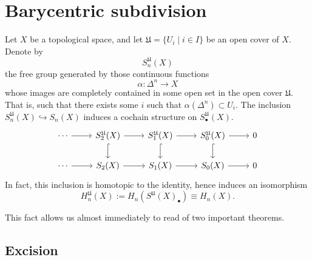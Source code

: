 \documentclass[main.tex]{subfiles}
\begin{document}
\section{Barycentric subdivision}
\label{sec:barycentric_subdivision}

\begin{fact}
  \label{fact:barycentric_subdivision}
  Let $X$ be a topological space, and let $\mathfrak{U} = \{U_{i} \mid i \in I\}$ be an open cover of $X$. Denote by
  \begin{equation*}
    S^{\mathfrak{U}}_{n}(X)
  \end{equation*}
  the free group generated by those continuous functions
  \begin{equation*}
    \alpha\colon \Delta^{n} \to X
  \end{equation*}
  whose images are completely contained in some open set in the open cover $\mathfrak{U}$. That is, such that there exists some $i$ such that $\alpha(\Delta^{n}) \subset U_{i}$. The inclusion $S^{\mathfrak{U}}_{n}(X) \hookrightarrow S_{n}(X)$ induces a cochain structure on $S^{\mathfrak{U}}_{\bullet}(X)$.
  \begin{equation*}
    \begin{tikzcd}
      \cdots
      \arrow[r]
      & S^{\mathfrak{U}}_{2}(X)
      \arrow[r]
      \arrow[d, hook]
      & S^{\mathfrak{U}}_{1}(X)
      \arrow[r]
      \arrow[d, hook]
      & S^{\mathfrak{U}}_{0}(X)
      \arrow[r]
      \arrow[d, hook]
      & 0
      \\
      \cdots
      \arrow[r]
      & S_{2}(X)
      \arrow[r]
      & S_{1}(X)
      \arrow[r]
      & S_{0}(X)
      \arrow[r]
      & 0
    \end{tikzcd}
  \end{equation*}
  In fact, this inclusion is homotopic to the identity, hence induces an isomorphism
  \begin{equation*}
    H^{\mathfrak{U}}_{n}(X) := H_{n}(S^{\mathfrak{U}}(X)_{\bullet}) \equiv H_{n}(X).
  \end{equation*}
\end{fact}

This fact allows us almost immediately to read of two important theorems.

\subsection{Excision}
\label{ssc:excision}
\end{document}
